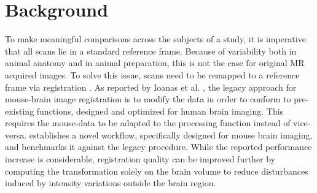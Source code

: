 \section{Background}
To make meaningful comparisons across the subjects of a study, it is imperative that all scans lie in a standard reference frame.
Because of variability both in animal anatomy and in animal preparation, this is not the case for original MR acquired images.
To solve this issue, scans need to be remapped to a reference frame via registration \cite{maintz_overview_nodate, sotiras_deformable_2013}.
As reported by Ioanas et al. \cite{ioanas_optimized_2019}, the legacy approach for mouse-brain image registration is to modify the data in order to conform to pre-existing functions, designed and optimized for human brain imaging.
This requires the mouse-data to be adapted to the processing function instead of vice-versa.
\cite{ioanas_optimized_2019} establishes a novel workflow, specifically designed for mouse brain imaging, and benchmarks it against the legacy procedure.
While the reported performance increase is considerable, registration quality can be improved further by computing the transformation solely on the brain volume to reduce disturbances induced by intensity variations outside the brain region.


